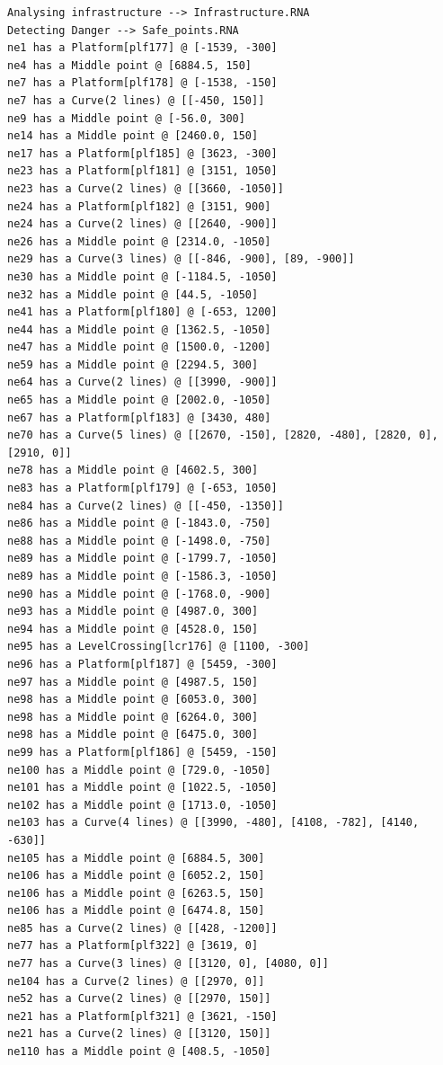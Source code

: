 	\begin{lstlisting}[language = {}, tabsize=4, basicstyle=\footnotesize\ttfamily, showspaces=false, showstringspaces=false, caption = Detección de puntos críticos por parte del RNA , label = {lst:EJ3_2}]
Analysing infrastructure --> Infrastructure.RNA
Detecting Danger --> Safe_points.RNA
ne1 has a Platform[plf177] @ [-1539, -300]
ne4 has a Middle point @ [6884.5, 150]
ne7 has a Platform[plf178] @ [-1538, -150]
ne7 has a Curve(2 lines) @ [[-450, 150]]
ne9 has a Middle point @ [-56.0, 300]
ne14 has a Middle point @ [2460.0, 150]
ne17 has a Platform[plf185] @ [3623, -300]
ne23 has a Platform[plf181] @ [3151, 1050]
ne23 has a Curve(2 lines) @ [[3660, -1050]]
ne24 has a Platform[plf182] @ [3151, 900]
ne24 has a Curve(2 lines) @ [[2640, -900]]
ne26 has a Middle point @ [2314.0, -1050]
ne29 has a Curve(3 lines) @ [[-846, -900], [89, -900]]
ne30 has a Middle point @ [-1184.5, -1050]
ne32 has a Middle point @ [44.5, -1050]
ne41 has a Platform[plf180] @ [-653, 1200]
ne44 has a Middle point @ [1362.5, -1050]
ne47 has a Middle point @ [1500.0, -1200]
ne59 has a Middle point @ [2294.5, 300]
ne64 has a Curve(2 lines) @ [[3990, -900]]
ne65 has a Middle point @ [2002.0, -1050]
ne67 has a Platform[plf183] @ [3430, 480]
ne70 has a Curve(5 lines) @ [[2670, -150], [2820, -480], [2820, 0], [2910, 0]]
ne78 has a Middle point @ [4602.5, 300]
ne83 has a Platform[plf179] @ [-653, 1050]
ne84 has a Curve(2 lines) @ [[-450, -1350]]
ne86 has a Middle point @ [-1843.0, -750]
ne88 has a Middle point @ [-1498.0, -750]
ne89 has a Middle point @ [-1799.7, -1050]
ne89 has a Middle point @ [-1586.3, -1050]
ne90 has a Middle point @ [-1768.0, -900]
ne93 has a Middle point @ [4987.0, 300]
ne94 has a Middle point @ [4528.0, 150]
ne95 has a LevelCrossing[lcr176] @ [1100, -300]
ne96 has a Platform[plf187] @ [5459, -300]
ne97 has a Middle point @ [4987.5, 150]
ne98 has a Middle point @ [6053.0, 300]
ne98 has a Middle point @ [6264.0, 300]
ne98 has a Middle point @ [6475.0, 300]
ne99 has a Platform[plf186] @ [5459, -150]
ne100 has a Middle point @ [729.0, -1050]
ne101 has a Middle point @ [1022.5, -1050]
ne102 has a Middle point @ [1713.0, -1050]
ne103 has a Curve(4 lines) @ [[3990, -480], [4108, -782], [4140, -630]]
ne105 has a Middle point @ [6884.5, 300]
ne106 has a Middle point @ [6052.2, 150]
ne106 has a Middle point @ [6263.5, 150]
ne106 has a Middle point @ [6474.8, 150]
ne85 has a Curve(2 lines) @ [[428, -1200]]
ne77 has a Platform[plf322] @ [3619, 0]
ne77 has a Curve(3 lines) @ [[3120, 0], [4080, 0]]
ne104 has a Curve(2 lines) @ [[2970, 0]]
ne52 has a Curve(2 lines) @ [[2970, 150]]
ne21 has a Platform[plf321] @ [3621, -150]
ne21 has a Curve(2 lines) @ [[3120, 150]]
ne110 has a Middle point @ [408.5, -1050]
	\end{lstlisting}
	
